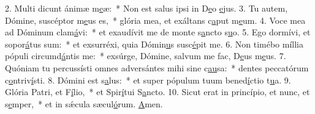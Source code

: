2. Multi dicunt ánimæ m\uline{e}æ:~* Non est salus ipsi in D\uline{e}o \uline{e}jus.
3. Tu autem, Dómine, suscéptor m\uline{e}us es,~* glória mea, et exáltans c\uline{a}put m\uline{e}um.
4. Voce mea ad Dóminum clam\uline{á}vi:~* et exaudívit me de monte s\uline{a}ncto s\uline{u}o.
5. Ego dormívi, et sopor\uline{á}tus sum:~* et exsurréxi, quia Dómin\uline{u}s susc\uline{é}pit me.
6. Non timébo míllia pópuli circumd\uline{á}ntis me:~* exsúrge, Dómine, salvum me fac, D\uline{e}us m\uline{e}us.
7. Quóniam tu percussísti omnes adversántes mihi sine c\uline{au}sa:~* dentes peccatórum c\uline{o}ntriv\uline{í}sti.
8. Dómini est s\uline{a}lus:~* et super pópulum tuum bened\uline{í}ctio t\uline{u}a.
9. Glória Patri, et F\uline{í}lio,~* et Spir\uline{í}tui S\uline{a}ncto.
10. Sicut erat in princípio, et nunc, et s\uline{e}mper,~* et in sǽcula sæcul\uline{ó}rum. \uline{A}men.
